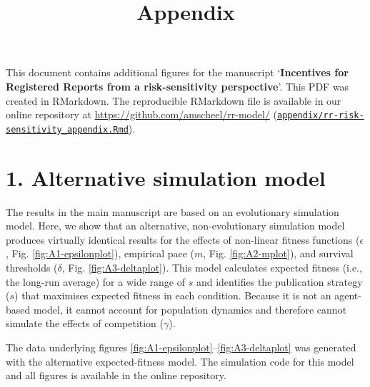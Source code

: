 \documentclass[
]{article}
\title{Appendix}
\author{}
\date{\vspace{-2.5em}}
\begin{document}
\maketitle

\raggedright
\setcounter{table}{0}\setcounter{figure}{0}

This document contains additional figures for the manuscript `\textbf{Incentives for Registered Reports from a risk-sensitivity perspective}'. This PDF was created in RMarkdown. The reproducible RMarkdown file is available in our online repository at \url{https://github.com/amscheel/rr-model/} (\href{address}{\texttt{appendix/rr-risk-sensitivity\_appendix.Rmd}}).

\hypertarget{alternative-simulation-model}{%
\section{1. Alternative simulation model}\label{alternative-simulation-model}}

The results in the main manuscript are based on an evolutionary simulation model.
Here, we show that an alternative, non-evolutionary simulation model produces virtually identical results for the effects of non-linear fitness functions (\(\epsilon\), Fig. \ref{fig:A1-epsilonplot}), empirical pace (\(m\), Fig. \ref{fig:A2-mplot}), and survival thresholds (\(\delta\), Fig. \ref{fig:A3-deltaplot}).
This model calculates expected fitness (i.e., the long-run average) for a wide range of \(s\) and identifies the publication strategy (\(s\)) that maximises expected fitness in each condition.
Because it is not an agent-based model, it cannot account for population dynamics and therefore cannot simulate the effects of competition (\(\gamma\)).

The data underlying figures \ref{fig:A1-epsilonplot}--\ref{fig:A3-deltaplot} was generated with the alternative expected-fitness model.
The simulation code for this model and all figures is available in the online repository.
\end{document}
